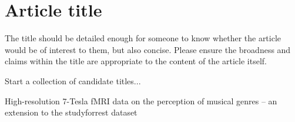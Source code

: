 \section*{Article title}
The title should be detailed enough for someone to know whether the article would be of interest to them, but also concise. Please ensure the broadness and claims within the title are appropriate to the content of the article itself.

Start a collection of candidate titles...

High-resolution 7-Tesla fMRI data on the perception of musical genres -- an extension to the studyforrest dataset